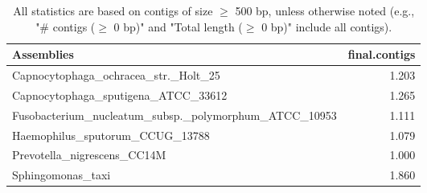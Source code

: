 \documentclass[12pt,a4paper]{article}
\begin{document}
\begin{table}[ht]
\begin{center}
\caption{All statistics are based on contigs of size $\geq$ 500 bp, unless otherwise noted (e.g., "\# contigs ($\geq$ 0 bp)" and "Total length ($\geq$ 0 bp)" include all contigs).}
\begin{tabular}{|l*{1}{|r}|}
\hline
Assemblies & final.contigs \\ \hline
Capnocytophaga\_ochracea\_str.\_Holt\_25 & 1.203 \\ \hline
Capnocytophaga\_sputigena\_ATCC\_33612 & 1.265 \\ \hline
Fusobacterium\_nucleatum\_subsp.\_polymorphum\_ATCC\_10953 & 1.111 \\ \hline
Haemophilus\_sputorum\_CCUG\_13788 & 1.079 \\ \hline
Prevotella\_nigrescens\_CC14M & 1.000 \\ \hline
Sphingomonas\_taxi & 1.860 \\ \hline
\end{tabular}
\end{center}
\end{table}
\end{document}
